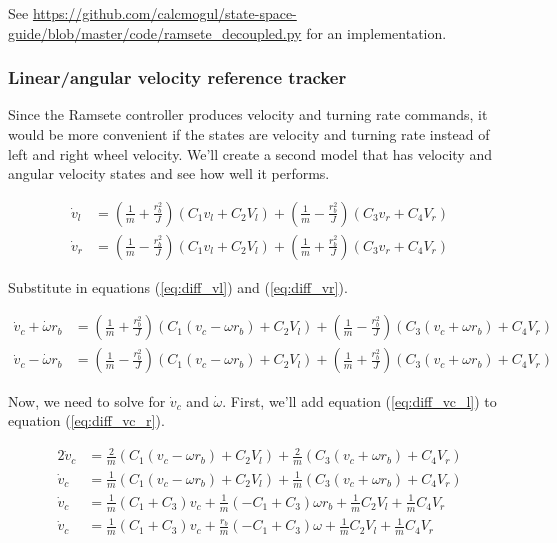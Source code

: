 See
\url{https://github.com/calcmogul/state-space-guide/blob/master/code/ramsete_decoupled.py}
for an implementation.

\subsubsection{Linear/angular velocity reference tracker}

Since the Ramsete controller produces velocity and turning rate commands, it
would be more convenient if the \glspl{state} are velocity and turning rate
instead of left and right wheel velocity. We'll create a second model that has
velocity and angular velocity states and see how well it performs.

\begin{align*}
  \dot{v}_l &= \left(\frac{1}{m} + \frac{r_b^2}{J}\right)
    \left(C_1 v_l + C_2 V_l\right) +
    \left(\frac{1}{m} - \frac{r_b^2}{J}\right) \left(C_3 v_r + C_4 V_r\right) \\
  \dot{v}_r &= \left(\frac{1}{m} - \frac{r_b^2}{J}\right)
    \left(C_1 v_l + C_2 V_l\right) +
    \left(\frac{1}{m} + \frac{r_b^2}{J}\right) \left(C_3 v_r + C_4 V_r\right)
\end{align*}

Substitute in equations (\ref{eq:diff_vl}) and (\ref{eq:diff_vr}).

\begin{align}
  \dot{v}_c + \dot{\omega} r_b &= \left(\frac{1}{m} + \frac{r_b^2}{J}\right)
    \left(C_1(v_c - \omega r_b) + C_2 V_l\right) +
    \left(\frac{1}{m} - \frac{r_b^2}{J}\right) \left(C_3(v_c + \omega r_b) +
      C_4 V_r\right) \label{eq:diff_vc_l} \\
  \dot{v}_c - \dot{\omega} r_b &= \left(\frac{1}{m} - \frac{r_b^2}{J}\right)
    \left(C_1(v_c - \omega r_b) + C_2 V_l\right) +
    \left(\frac{1}{m} + \frac{r_b^2}{J}\right) \left(C_3(v_c + \omega r_b) +
      C_4 V_r\right) \label{eq:diff_vc_r}
\end{align}

Now, we need to solve for $\dot{v}_c$ and $\dot{\omega}$. First, we'll add
equation (\ref{eq:diff_vc_l}) to equation (\ref{eq:diff_vc_r}).

\begin{align*}
  2\dot{v}_c &= \frac{2}{m} \left(C_1(v_c - \omega r_b) + C_2 V_l\right) +
    \frac{2}{m} \left(C_3(v_c + \omega r_b) + C_4 V_r\right) \\
  \dot{v}_c &= \frac{1}{m} \left(C_1(v_c - \omega r_b) + C_2 V_l\right) +
    \frac{1}{m} \left(C_3(v_c + \omega r_b) + C_4 V_r\right) \\
  \dot{v}_c &= \frac{1}{m} (C_1 + C_3) v_c +
    \frac{1}{m} (-C_1 + C_3) \omega r_b + \frac{1}{m} C_2 V_l +
    \frac{1}{m} C_4 V_r \\
  \dot{v}_c &= \frac{1}{m} (C_1 + C_3) v_c + \frac{r_b}{m} (-C_1 + C_3) \omega +
    \frac{1}{m} C_2 V_l + \frac{1}{m} C_4 V_r
\end{align*}

